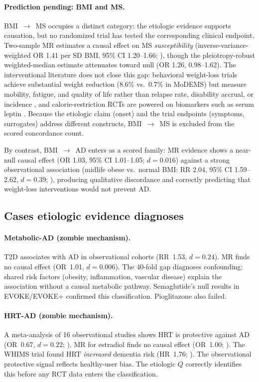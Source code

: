 \documentclass[11pt]{article}
\begin{document}
\paragraph{Prediction pending: BMI and MS.}
BMI~$\to$~MS occupies a distinct category: the etiologic evidence supports causation, but no randomized trial has tested the corresponding clinical endpoint. Two-sample MR estimates a causal effect on MS \emph{susceptibility} (inverse-variance-weighted OR 1.41 per SD BMI, 95\% CI 1.20--1.66; \citealp{mokry2016obesity}), though the pleiotropy-robust weighted-median estimate attenuates toward null (OR 1.26, 0.98--1.62). The interventional literature does not close this gap: behavioral weight-loss trials achieve substantial weight reduction (8.6\% vs.\ 0.7\% in MoDEMS) but measure mobility, fatigue, and quality of life rather than relapse rate, disability accrual, or incidence \citep{bruce2023modems}, and calorie-restriction RCTs are powered on biomarkers such as serum leptin \citep{ghezzi2025icr}. Because the etiologic claim (onset) and the trial endpoints (symptoms, surrogates) address different constructs, BMI~$\to$~MS is excluded from the scored concordance count.

By contrast, BMI~$\to$~AD enters as a scored family: MR evidence shows a near-null causal effect (OR 1.03, 95\% CI 1.01--1.05; $d = 0.016$) against a strong observational association (midlife obese vs.\ normal BMI: RR 2.04, 95\% CI 1.59--2.62, $d = 0.39$; \citealp{anstey2011}), producing qualitative discordance and correctly predicting that weight-loss interventions would not prevent AD.

\subsection{Cases etiologic evidence diagnoses}

\paragraph{Metabolic-AD (zombie mechanism).} T2D associates with AD in observational cohorts (RR~1.53, $d = 0.24$). MR finds no causal effect (OR~1.01, $d = 0.006$). The 40-fold gap diagnoses confounding: shared risk factors (obesity, inflammation, vascular disease) explain the association without a causal metabolic pathway. Semaglutide's null results in EVOKE/EVOKE+ confirmed this classification. Pioglitazone also failed.

\paragraph{HRT-AD (zombie mechanism).} A meta-analysis of 16 observational studies shows HRT is protective against AD (OR~0.67, $d = 0.22$; \citealp{song2020}). MR for estradiol finds no causal effect (OR~1.00; \citealp{barth2025}). The WHIMS trial found HRT \emph{increased} dementia risk (HR~1.76; \citealp{shumaker2003}). The observational protective signal reflects healthy-user bias. The etiologic $Q$ correctly identifies this before any RCT data enters the classification.
\end{document}
